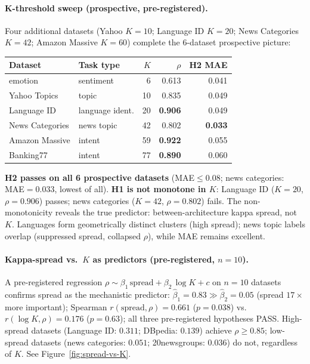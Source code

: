 \documentclass{article}
\begin{document}
\paragraph{K-threshold sweep (prospective, pre-registered).}
Four additional datasets (Yahoo $K=10$; Language ID $K=20$; News Categories $K=42$; Amazon Massive $K=60$) complete the 6-dataset prospective picture:
\begin{center}
\begin{tabular}{llrrr}
\toprule
Dataset & Task type & $K$ & $\rho$ & H2 MAE \\
\midrule
emotion        & sentiment      & 6  & 0.613 & 0.041 \\
Yahoo Topics   & topic          & 10 & 0.835 & 0.049 \\
Language ID    & language ident.& 20 & \textbf{0.906} & 0.049 \\
News Categories& news topic     & 42 & 0.802 & \textbf{0.033} \\
Amazon Massive & intent         & 59 & \textbf{0.922} & 0.055 \\
Banking77      & intent         & 77 & \textbf{0.890} & 0.060 \\
\bottomrule
\end{tabular}
\end{center}
\textbf{H2 passes on all 6 prospective datasets} (MAE$\leq$0.08; news categories: MAE$=0.033$, lowest of all).
\textbf{H1 is not monotone in $K$}: Language ID ($K=20$, $\rho=0.906$) passes; news categories ($K=42$, $\rho=0.802$) fails.
The non-monotonicity reveals the true predictor: between-architecture kappa spread, not $K$.
Languages form geometrically distinct clusters (high spread); news topic labels overlap (suppressed spread, collapsed $\rho$), while MAE remains excellent.

\paragraph{Kappa-spread vs.\ $K$ as predictors (pre-registered, $n=10$).}
A pre-registered regression $\rho \sim \beta_1\,\mathrm{spread} + \beta_2\,\log K + c$ on $n=10$ datasets confirms spread as the mechanistic predictor: $\hat\beta_1=0.83\gg\hat\beta_2=0.05$ (spread $17\times$ more important); Spearman $r(\mathrm{spread},\rho)=0.661$ ($p=0.038$) vs.\ $r(\log K,\rho)=0.176$ ($p=0.63$); all three pre-registered hypotheses PASS.
High-spread datasets (Language ID: $0.311$; DBpedia: $0.139$) achieve $\rho\geq0.85$; low-spread datasets (news categories: $0.051$; 20newsgroups: $0.036$) do not, regardless of $K$.
See Figure~\ref{fig:spread-vs-K}.
\end{document}
